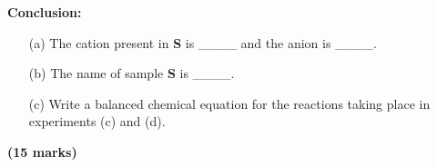 \begin{enumerate}
\textbf{Conclusion:}\\
\begin{enumerate}
\item[(a)] The cation present in \textbf{S} is \_\_\_\_ and the anion is \_\_\_\_.\\
\item[(b)] The name of sample \textbf{S} is \_\_\_\_.\\
\item[(c)] Write a balanced chemical equation for the reactions taking place in experiments (c) and (d).\\
\end{enumerate}


\raggedleft \textbf{(15 marks)} \pagebreak

\raggedright

\end{enumerate}